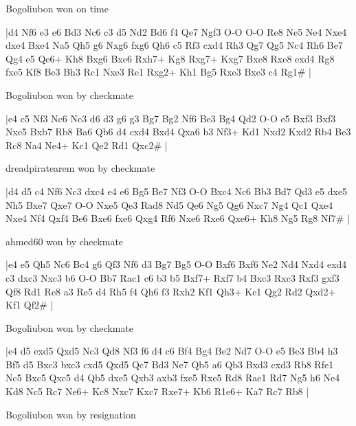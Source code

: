 \showboard

Bogoliubon won on time

\makegametitle
|d4 Nf6 e3 e6 Bd3 Nc6 c3 d5 Nd2 Bd6 f4 Qe7 Ngf3 O-O O-O Re8 Ne5 Ne4 Nxe4 dxe4 Bxe4 Na5 Qh5 g6 Nxg6 fxg6 Qh6 c5 Rf3 cxd4 Rh3 Qg7 Qg5 Nc4 Rh6 Be7 Qg4 e5 Qe6+ Kh8 Bxg6 Bxe6 Rxh7+ Kg8 Rxg7+ Kxg7 Bxe8 Rxe8 exd4 Rg8 fxe5 Kf8 Be3 Bh3 Rc1 Nxe3 Re1 Rxg2+ Kh1 Bg5 Rxe3 Bxe3 c4 Rg1\#  |

\showboard

Bogoliubon won by checkmate

\makegametitle
|e4 c5 Nf3 Nc6 Nc3 d6 d3 g6 g3 Bg7 Bg2 Nf6 Be3 Bg4 Qd2 O-O e5 Bxf3 Bxf3 Nxe5 Bxb7 Rb8 Ba6 Qb6 d4 cxd4 Bxd4 Qxa6 b3 Nf3+ Kd1 Nxd2 Kxd2 Rb4 Be3 Rc8 Na4 Ne4+ Kc1 Qe2 Rd1 Qxc2\#  |

\showboard

dreadpiratearem won by checkmate

\makegametitle
|d4 d5 c4 Nf6 Nc3 dxc4 e4 e6 Bg5 Be7 Nf3 O-O Bxc4 Nc6 Bb3 Bd7 Qd3 e5 dxe5 Nh5 Bxe7 Qxe7 O-O Nxe5 Qe3 Rad8 Nd5 Qe6 Ng5 Qg6 Nxc7 Ng4 Qc1 Qxe4 Nxe4 Nf4 Qxf4 Be6 Bxe6 fxe6 Qxg4 Rf6 Nxe6 Rxe6 Qxe6+ Kh8 Ng5 Rg8 Nf7\#  |

\showboard

ahmed60 won by checkmate

\makegametitle
|e4 e5 Qh5 Nc6 Bc4 g6 Qf3 Nf6 d3 Bg7 Bg5 O-O Bxf6 Bxf6 Ne2 Nd4 Nxd4 exd4 c3 dxc3 Nxc3 b6 O-O Bb7 Rac1 c6 b3 b5 Bxf7+ Rxf7 b4 Bxc3 Rxc3 Rxf3 gxf3 Qf8 Rd1 Re8 a3 Re5 d4 Rh5 f4 Qh6 f3 Rxh2 Kf1 Qh3+ Ke1 Qg2 Rd2 Qxd2+ Kf1 Qf2\#  |

\showboard

Bogoliubon won by checkmate

\makegametitle
|e4 d5 exd5 Qxd5 Nc3 Qd8 Nf3 f6 d4 c6 Bf4 Bg4 Be2 Nd7 O-O e5 Be3 Bb4 h3 Bf5 d5 Bxc3 bxc3 cxd5 Qxd5 Qc7 Bd3 Ne7 Qb5 a6 Qb3 Bxd3 cxd3 Rb8 Rfe1 Nc5 Bxc5 Qxc5 d4 Qb5 dxe5 Qxb3 axb3 fxe5 Rxe5 Rd8 Rae1 Rd7 Ng5 h6 Ne4 Kd8 Nc5 Rc7 Ne6+ Kc8 Nxc7 Kxc7 Rxe7+ Kb6 R1e6+ Ka7 Rc7 Rb8  |

\showboard

Bogoliubon won by resignation

